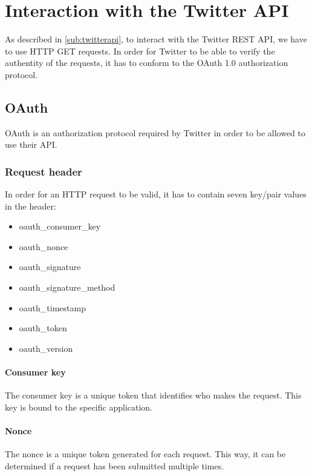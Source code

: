 \chapter{Interaction with the Twitter \ac{API}}
As described in \autoref{sub:twitterapi}, to interact with the Twitter
\ac{REST} \ac{API}, we have to use \ac{HTTP} GET requests. In order for
Twitter to be able to verify the authentity of the requests, it has to conform
to the OAuth 1.0 authorization protocol.
\section{OAuth}
OAuth is an authorization protocol required by Twitter in order to be allowed to
use their \ac{API}.

\subsection{Request header}
In order for an \ac{HTTP} request to be valid, it has to
contain seven key/pair values in the header:
\begin{itemize}
  \item oauth\_consumer\_key
  \item oauth\_nonce
  \item oauth\_signature
  \item oauth\_signature\_method
  \item oauth\_timestamp
  \item oauth\_token
  \item oauth\_version
\end{itemize}

\subsubsection*{Consumer key}
The consumer key is a unique token that identifies who makes the request.
This key is bound to the specific application.

\subsubsection*{Nonce}
The nonce is a unique token generated for each request. This way, it can be
determined if a request has been submitted multiple times. 

